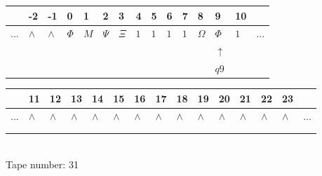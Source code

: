 \documentclass[11pt]{article}
\begin{document}
\begin{table}[H]
\centering
\begin{tabular}{lllllllllllllll}
 & -2 & -1 & 0 & 1 & 2 & 3 & 4 & 5 & 6 & 7 & 8 & 9 & 10 & \\
\hline
$...$ & \multicolumn{1}{|l|}{$\wedge$} & \multicolumn{1}{|l|}{$\wedge$} & \multicolumn{1}{|l|}{$\Phi$} & \multicolumn{1}{|l|}{$M$} & \multicolumn{1}{|l|}{$\Psi$} & \multicolumn{1}{|l|}{$\Xi$} & \multicolumn{1}{|l|}{$1$} & \multicolumn{1}{|l|}{$1$} & \multicolumn{1}{|l|}{$1$} & \multicolumn{1}{|l|}{$1$} & \multicolumn{1}{|l|}{$\Omega$} & \multicolumn{1}{|l|}{$\Phi$} & \multicolumn{1}{|l|}{$1$} & $...$\\
\hline
&  &  &  &  &  &  &  &  &  &  &  & $\uparrow$ &  &  \\
&  &  &  &  &  &  &  &  &  &  &  & $ q9 $ &  &  \\
\end{tabular}
\begin{tabular}{lllllllllllllll}
 & 11 & 12 & 13 & 14 & 15 & 16 & 17 & 18 & 19 & 20 & 21 & 22 & 23 & \\
\hline
$...$ & \multicolumn{1}{|l|}{$\wedge$} & \multicolumn{1}{|l|}{$\wedge$} & \multicolumn{1}{|l|}{$\wedge$} & \multicolumn{1}{|l|}{$\wedge$} & \multicolumn{1}{|l|}{$\wedge$} & \multicolumn{1}{|l|}{$\wedge$} & \multicolumn{1}{|l|}{$\wedge$} & \multicolumn{1}{|l|}{$\wedge$} & \multicolumn{1}{|l|}{$\wedge$} & \multicolumn{1}{|l|}{$\wedge$} & \multicolumn{1}{|l|}{$\wedge$} & \multicolumn{1}{|l|}{$\wedge$} & \multicolumn{1}{|l|}{$\wedge$} & $...$\\
\hline
&  &  &  &  &  &  &  &  &  &  &  &  &  &  \\
&  &  &  &  &  &  &  &  &  &  &  &  &  &  \\
\end{tabular}
\\
Tape number: 31
\noindent\makebox[\linewidth]{\hdashrule{\textwidth}{1pt}{1pt}}\end{table}
\clearpage
\end{document}
